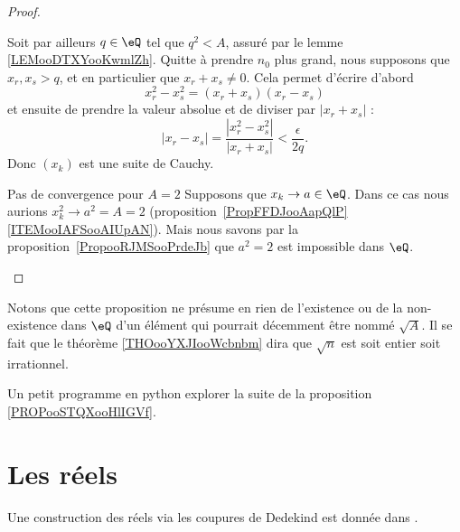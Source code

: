 \begin{proof}
\begin{subproof}
            Soit par ailleurs \( q\in \eQ\) tel que \( q^2<A\), assuré par le lemme \ref{LEMooDTXYooKwmlZh}. Quitte à prendre \( n_0\) plus grand, nous supposons que \( x_r,x_s>q\), et en particulier que \( x_r+x_s\neq 0\). Cela permet d'écrire d'abord
            \begin{equation}
                x_r^2-x_s^2=(x_r+x_s)(x_r-x_s)
            \end{equation}
            et ensuite de prendre la valeur absolue et de diviser par \( | x_r+x_s |\) :
            \begin{equation}
                | x_r-x_s |=\frac{ | x_r^2-x_s^2 | }{ | x_r+x_s | }<\frac{ \epsilon }{ 2q }.
            \end{equation}
            Donc \( (x_k)\) est une suite de Cauchy.
        \item[Pas de convergence pour \( A=2\)]
            Supposons que \( x_k\to a\in \eQ\). Dans ce cas nous aurions \( x_k^2\to a^2=A=2\) (proposition~\ref{PropFFDJooAapQlP}\ref{ITEMooIAFSooAIUpAN}). Mais nous savons par la proposition~\ref{PropooRJMSooPrdeJb} que \( a^2=2\) est impossible dans \( \eQ\).
    \end{subproof}
\end{proof}

Notons que cette proposition ne présume en rien de l'existence ou de la non-existence dans \( \eQ\) d'un élément qui pourrait décemment être nommé \( \sqrt{ A }\). Il se fait que le théorème \ref{THOooYXJIooWcbnbm} dira que \( \sqrt{ n }\) est soit entier soit irrationnel.

\begin{normaltext}
    Un petit programme en python explorer la suite de la proposition \ref{PROPooSTQXooHlIGVf}.
    
\end{normaltext}

\section{Les réels}

Une construction des réels via les coupures de Dedekind est donnée dans \cite{PaulinTopGmVegN}.

